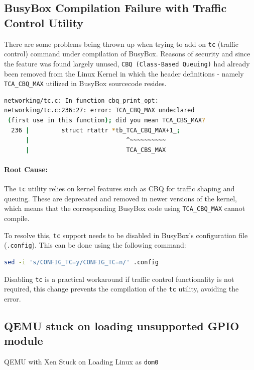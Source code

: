 \documentclass[acmtog]{acmart}
\begin{document}
\subsection{BusyBox Compilation Failure with Traffic Control Utility}

There are some problems being thrown up when trying to add on \texttt{tc} (traffic control) command under compilation of BusyBox. Reasons of security and since the feature was found largely unused,  \texttt{CBQ (Class-Based Queuing)} had already been removed from the Linux Kernel in which the header definitions - namely \texttt{TCA\_CBQ\_MAX} utilized in BusyBox sourcecode resides.

\begin{lstlisting}[language=bash, caption=Failure on compile BusyBox]
networking/tc.c: In function cbq_print_opt:
networking/tc.c:236:27: error: TCA_CBQ_MAX undeclared
 (first use in this function); did you mean TCA_CBS_MAX?
  236 |         struct rtattr *tb_TCA_CBQ_MAX+1_;
      |                           ^~~~~~~~~~~
      |                           TCA_CBS_MAX
\end{lstlisting}

\paragraph{Root Cause:}The \texttt{tc} utility relies on kernel features such as CBQ for traffic shaping and queuing. These are deprecated and removed in newer versions of the kernel, which means that the corresponding BusyBox code using \texttt{TCA\_CBQ\_MAX} cannot compile.

To resolve this, \texttt{tc} support needs to be disabled in BusyBox's configuration file (\texttt{.config}). This can be done using the following command:

\begin{lstlisting}[language=bash, caption=Solution to Disable Traffic Control ]
sed -i 's/CONFIG_TC=y/CONFIG_TC=n/' .config
\end{lstlisting}

Disabling \texttt{tc} is a practical workaround if traffic control functionality is not required, this change prevents the compilation of the \texttt{tc} utility, avoiding the error.





\subsection{QEMU stuck on loading unsupported GPIO module}
QEMU with Xen Stuck on Loading Linux as \texttt{dom0}
\end{document}
